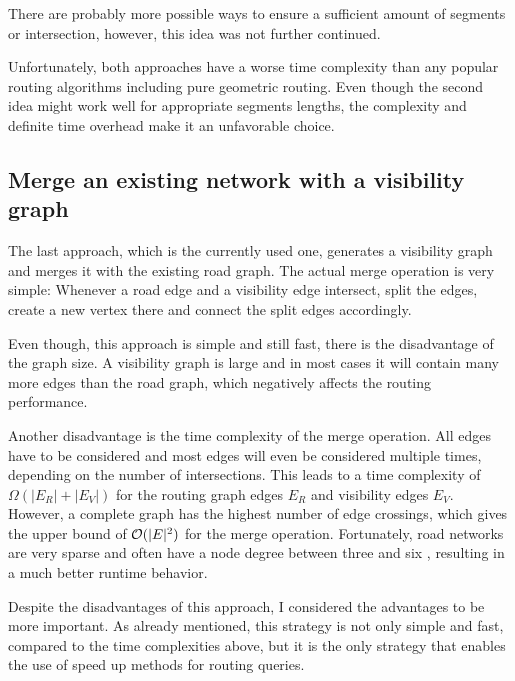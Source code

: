 		There are probably more possible ways to ensure a sufficient amount of segments or intersection, however, this idea was not further continued.
		
		Unfortunately, both approaches have a worse time complexity than any popular routing algorithms including pure geometric routing.
		Even though the second idea might work well for appropriate segments lengths, the complexity and definite time overhead make it an unfavorable choice.
	
	\subsection{Merge an existing network with a visibility graph}
	
		The last approach, which is the currently used one, generates a visibility graph and merges it with the existing road graph.
		The actual merge operation is very simple:
		Whenever a road edge and a visibility edge intersect, split the edges, create a new vertex there and connect the split edges accordingly.
		
		Even though, this approach is simple and still fast, there is the disadvantage of the graph size.
		A visibility graph is large and in most cases it will contain many more edges than the road graph, which negatively affects the routing performance.
		
		Another disadvantage is the time complexity of the merge operation.
		All edges have to be considered and most edges will even be considered multiple times, depending on the number of intersections.
		This leads to a time complexity of $\Omega(|E_R| + |E_V|)$ for the routing graph edges $E_R$ and visibility edges $E_V$.
		However, a complete graph has the highest number of edge crossings, which gives the upper bound of $\mathcal{O}(|E|^2)$ for the merge operation.
		Fortunately, road networks are very sparse and often have a node degree between three and six \cite{zhao-analysis-osm-bejing}\cite{boeing-osmnx}, resulting in a much better runtime behavior.
		
		Despite the disadvantages of this approach, I considered the advantages to be more important.
		As already mentioned, this strategy is not only simple and fast, compared to the time complexities above, but it is the only strategy that enables the use of speed up methods for routing queries.
		
